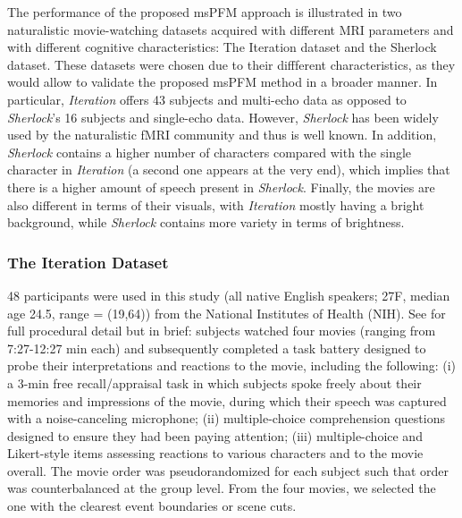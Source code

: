 The performance of the proposed msPFM approach is illustrated in two
naturalistic movie-watching datasets acquired with different MRI parameters and
with different cognitive characteristics: The Iteration dataset and the Sherlock
dataset. These datasets were chosen due to their diffferent characteristics, as
they would allow to validate the proposed msPFM method in a broader manner. In
particular, \textit{Iteration} offers 43 subjects and multi-echo data as opposed
to \textit{Sherlock}'s 16 subjects and single-echo data. However,
\textit{Sherlock} has been widely used by the naturalistic fMRI community and
thus is well known. In addition, \textit{Sherlock} contains a higher number of
characters compared with the single character in \textit{Iteration} (a second
one appears at the very end), which implies that there is a higher amount of
speech present in \textit{Sherlock}. Finally, the movies are also different in
terms of their visuals, with \textit{Iteration} mostly having a bright
background, while \textit{Sherlock} contains more variety in terms of
brightness.

\subsubsection*{The Iteration Dataset}\label{the-iteration-dataset} 

48 participants were used in this study (all native English speakers; 27F,
median age 24.5, range = (19,64)) from the National Institutes of Health (NIH).
See \cite{SavaSegal2022Individualvariabilityneural} for full procedural detail
but in brief: subjects watched four movies (ranging from 7:27-12:27 min each)
and subsequently completed a task battery designed to probe their
interpretations and reactions to the movie, including the following: (i) a 3-min
free recall/appraisal task in which subjects spoke freely about their memories
and impressions of the movie, during which their speech was captured with a
noise-canceling microphone; (ii) multiple-choice comprehension questions
designed to ensure they had been paying attention; (iii) multiple-choice and
Likert-style items assessing reactions to various characters and to the movie
overall. The movie order was pseudorandomized for each subject such that order
was counterbalanced at the group level. From the four movies, we selected the
one with the clearest event boundaries or scene cuts.

